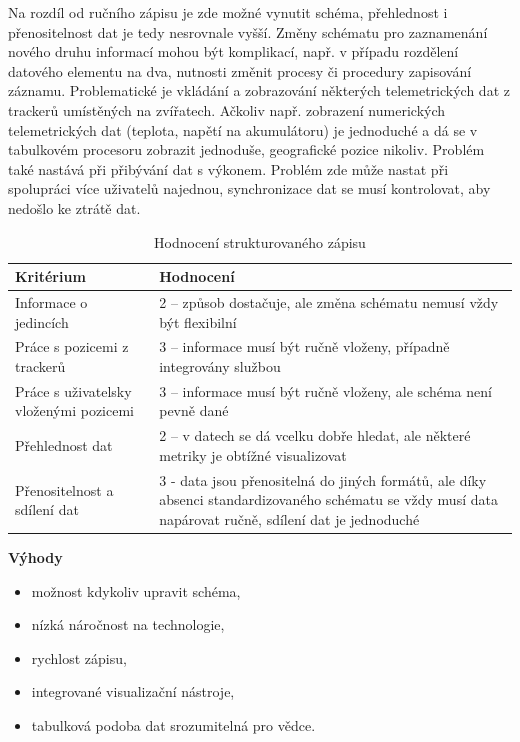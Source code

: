 Na rozdíl od ručního zápisu je zde možné vynutit schéma, přehlednost i přenositelnost dat je tedy nesrovnale vyšší. Změny schématu pro zaznamenání nového druhu informací mohou být komplikací, např. v případu rozdělení datového elementu na dva, nutnosti změnit procesy či procedury zapisování záznamu. Problematické je vkládání a zobrazování některých telemetrických dat z trackerů umístěných na zvířatech. Ačkoliv např. zobrazení numerických telemetrických dat (teplota, napětí na akumulátoru) je jednoduché a dá se v tabulkovém procesoru zobrazit jednoduše, geografické pozice nikoliv. Problém také nastává při přibývání dat s výkonem. Problém zde může nastat při spolupráci více uživatelů najednou, synchronizace dat se musí kontrolovat, aby nedošlo ke ztrátě dat.

\begin{table}[H]
	\begin{tabularx}{\textwidth}{ | X | X | }
		\hline
		Kritérium                              & Hodnocení \\
		\hline			
		Informace o jedincích                  & 2 -- způsob dostačuje, ale změna schématu nemusí vždy být flexibilní          \\
		\hline
		Práce s pozicemi z trackerů            & 3 -- informace musí být ručně vloženy, případně integrovány službou          \\
		\hline
		Práce s uživatelsky vloženými pozicemi & 3 -- informace musí být ručně vloženy, ale schéma není pevně dané          \\
		\hline
		Přehlednost dat                        & 2 -- v datech se dá vcelku dobře hledat, ale některé metriky je obtížné visualizovat          \\
		\hline
		Přenositelnost a sdílení dat           & 3 - data jsou přenositelná do jiných formátů, ale díky absenci standardizovaného schématu se vždy musí data napárovat ručně, sdílení dat je jednoduché          \\
		\hline	
	\end{tabularx}
	\caption{Hodnocení strukturovaného zápisu}
\end{table}

\textbf{Výhody}
\nolisttopbreak
\begin{itemize}
	\item možnost kdykoliv upravit schéma,
	\item nízká náročnost na technologie,
	\item rychlost zápisu,
	\item integrované visualizační nástroje,
	\item tabulková podoba dat srozumitelná pro vědce.
\end{itemize}

